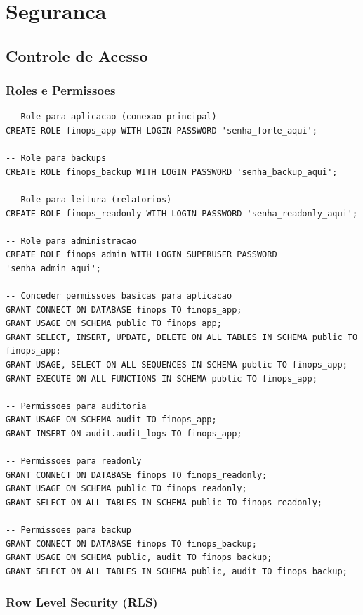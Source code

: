\section{Seguranca}

\subsection{Controle de Acesso}

\subsubsection{Roles e Permissoes}

\begin{lstlisting}[caption=Criacao de roles de seguranca]
-- Role para aplicacao (conexao principal)
CREATE ROLE finops_app WITH LOGIN PASSWORD 'senha_forte_aqui';

-- Role para backups
CREATE ROLE finops_backup WITH LOGIN PASSWORD 'senha_backup_aqui';

-- Role para leitura (relatorios)
CREATE ROLE finops_readonly WITH LOGIN PASSWORD 'senha_readonly_aqui';

-- Role para administracao
CREATE ROLE finops_admin WITH LOGIN SUPERUSER PASSWORD 'senha_admin_aqui';

-- Conceder permissoes basicas para aplicacao
GRANT CONNECT ON DATABASE finops TO finops_app;
GRANT USAGE ON SCHEMA public TO finops_app;
GRANT SELECT, INSERT, UPDATE, DELETE ON ALL TABLES IN SCHEMA public TO finops_app;
GRANT USAGE, SELECT ON ALL SEQUENCES IN SCHEMA public TO finops_app;
GRANT EXECUTE ON ALL FUNCTIONS IN SCHEMA public TO finops_app;

-- Permissoes para auditoria
GRANT USAGE ON SCHEMA audit TO finops_app;
GRANT INSERT ON audit.audit_logs TO finops_app;

-- Permissoes para readonly
GRANT CONNECT ON DATABASE finops TO finops_readonly;
GRANT USAGE ON SCHEMA public TO finops_readonly;
GRANT SELECT ON ALL TABLES IN SCHEMA public TO finops_readonly;

-- Permissoes para backup
GRANT CONNECT ON DATABASE finops TO finops_backup;
GRANT USAGE ON SCHEMA public, audit TO finops_backup;
GRANT SELECT ON ALL TABLES IN SCHEMA public, audit TO finops_backup;
\end{lstlisting}

\subsubsection{Row Level Security (RLS)}

